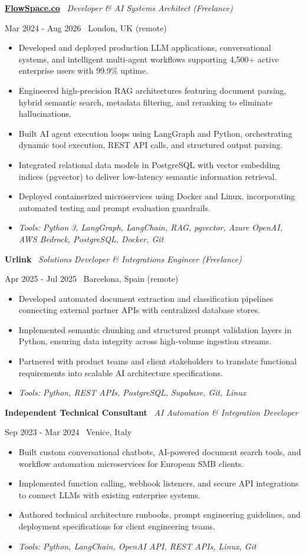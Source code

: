 \documentclass[a4paper,10pt]{article}
\newcommand{\role}[4]{%
  \vspace{2pt}\noindent
  \begin{minipage}[t]{0.70\textwidth}\raggedright\textbf{#1} \textbullet\ \textit{#3}\end{minipage}%
  \hfill
  \begin{minipage}[t]{0.28\textwidth}\raggedleft\footnotesize\color{gray}#2 \textbullet\ #4\end{minipage}%
  \vspace{1pt}%
}
\begin{document}
\role{\href{https://flowspace.co}{FlowSpace.co}}{Mar 2024 - Aug 2026}{Developer \& AI Systems Architect (Freelance)}{London, UK (remote)}
\begin{itemize}
  \item Developed and deployed production LLM applications, conversational systems, and intelligent multi-agent workflows supporting 4,500+ active enterprise users with 99.9\% uptime.
  \item Engineered high-precision RAG architectures featuring document parsing, hybrid semantic search, metadata filtering, and reranking to eliminate hallucinations.
  \item Built AI agent execution loops using LangGraph and Python, orchestrating dynamic tool execution, REST API calls, and structured output parsing.
  \item Integrated relational data models in PostgreSQL with vector embedding indices (pgvector) to deliver low-latency semantic information retrieval.
  \item Deployed containerized microservices using Docker and Linux, incorporating automated testing and prompt evaluation guardrails.
  \item \textit{Tools: Python 3, LangGraph, LangChain, RAG, pgvector, Azure OpenAI, AWS Bedrock, PostgreSQL, Docker, Git}
\end{itemize}

\role{Urlink}{Apr 2025 - Jul 2025}{Solutions Developer \& Integrations Engineer (Freelance)}{Barcelona, Spain (remote)}
\begin{itemize}
  \item Developed automated document extraction and classification pipelines connecting external partner APIs with centralized database stores.
  \item Implemented semantic chunking and structured prompt validation layers in Python, ensuring data integrity across high-volume ingestion streams.
  \item Partnered with product teams and client stakeholders to translate functional requirements into scalable AI architecture specifications.
  \item \textit{Tools: Python, REST APIs, PostgreSQL, Supabase, Git, Linux}
\end{itemize}

\role{Independent Technical Consultant}{Sep 2023 - Mar 2024}{AI Automation \& Integration Developer}{Venice, Italy}
\begin{itemize}
  \item Built custom conversational chatbots, AI-powered document search tools, and workflow automation microservices for European SMB clients.
  \item Implemented function calling, webhook listeners, and secure API integrations to connect LLMs with existing enterprise systems.
  \item Authored technical architecture runbooks, prompt engineering guidelines, and deployment specifications for client engineering teams.
  \item \textit{Tools: Python, LangChain, OpenAI API, REST APIs, Linux, Git}
\end{itemize}
\end{document}

